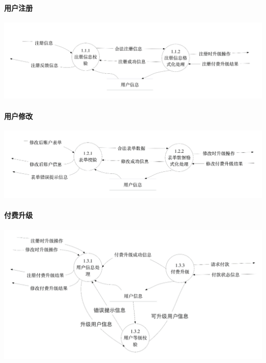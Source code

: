 \paragraph{用户注册}
\includegraphics{img/1.1.png}
\paragraph{用户修改}
\includegraphics{img/1.2.png}
\paragraph{付费升级}
\includegraphics{img/1.3.png}
